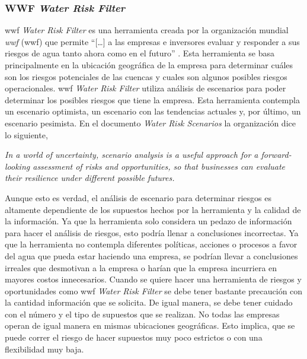 \subsubsection{WWF \textit{Water Risk Filter}} \label{subsubsec:wwf-water-risk-filter}
\acrshort{wwf} \textit{Water Risk Filter} es una herramienta creada por la organización mundial \textit{\acrlong{wwf}} (\acrshort{wwf}) que permite  “[…] a las empresas e inversores evaluar y responder a sus riesgos de agua tanto ahora como en el futuro” \parencite{world-wildlife-fund-2023}. Esta herramienta se basa principalmente en la ubicación geográfica de la empresa para determinar cuáles son los riesgos potenciales de las cuencas y cuales son algunos posibles riesgos operacionales. \acrshort{wwf} \textit{Water Risk Filter} utiliza análisis de escenarios para poder determinar los posibles riesgos que tiene la empresa. Esta herramienta contempla un escenario optimista, un escenario con las tendencias actuales y, por último, un escenario pesimista. En el documento \textit{Water Risk Scenarios} \parencite{world-wildlife-fund-2020} la organización dice lo siguiente,


\hfill
\par
\leftskip=0.35in \rightskip=0.35in
\textit{In a world of uncertainty, scenario analysis is a useful approach for a forward-looking assessment of risks and opportunities, so that businesses can evaluate their resilience under different possible futures.}

\hfill
\par
\leftskip=0in \rightskip=0in

Aunque esto es verdad, el análisis de escenario para determinar riesgos es altamente dependiente de los supuestos hechos por la herramienta y la calidad de la información. Ya que la herramienta solo considera un pedazo de información para hacer el análisis de riesgos, esto podría llenar a conclusiones incorrectas. Ya que la herramienta no contempla diferentes políticas, acciones o procesos a favor del agua que pueda estar haciendo una empresa, se podrían llevar a conclusiones irreales que desmotivan a la empresa o harían que la empresa incurriera en mayores costos innecesarios. Cuando se quiere hacer una herramienta de riesgos y oportunidades como  \acrshort{wwf} \textit{Water Risk Filter} se debe tener bastante precaución con la cantidad información que se solicita. De igual manera, se debe tener cuidado con el número y el tipo de supuestos que se realizan. No todas las empresas operan de igual manera en mismas ubicaciones geográficas. Esto implica, que se puede correr el riesgo de hacer supuestos muy poco estrictos o con una flexibilidad muy baja.



